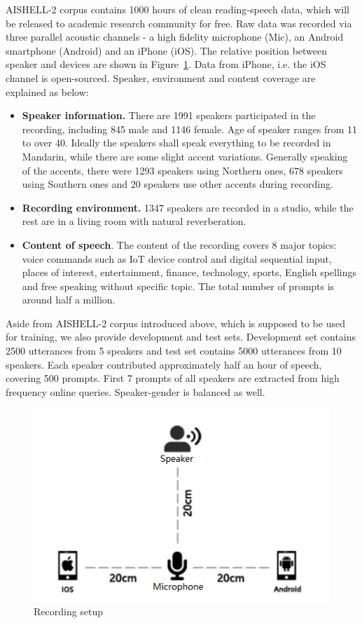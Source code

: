 \documentclass[a4paper]{article}
\begin{document}
AISHELL-2 corpus contains 1000 hours of clean reading-speech data, which will be released to academic research community for free. Raw data was recorded via three parallel acoustic channels - a high fidelity microphone (Mic), an Android smartphone (Android) and an iPhone (iOS). The relative position between speaker and devices are shown in Figure~\ref{fig:setup}. Data from iPhone, i.e. the iOS channel is open-sourced. Speaker, environment and content coverage are explained as below:
\begin{itemize}
\item \textbf{Speaker information.} There are 1991 speakers participated in the recording, including 845 male and 1146 female. Age of speaker ranges from 11 to over 40. Ideally the speakers shall speak everything to be recorded in Mandarin, while there are some slight accent variations. Generally speaking of the accents, there were 1293 speakers using Northern ones, 678 speakers using Southern ones and 20 speakers use other accents during recording.
\item \textbf{Recording environment.} 1347 speakers are recorded in a studio, while the rest are in a living room with natural reverberation.
\item \textbf{Content of speech}. The content of the recording covers 8 major topics: voice commands such as IoT device control and digital sequential input, places of interest, entertainment, finance, technology, sports, English spellings and free speaking without specific topic. The total number of prompts is around half a million.
\end{itemize}

\noindent Aside from AISHELL-2 corpus introduced above, which is supposed to be used for training,
we also provide development and test sets.
Development set contains 2500 utterances from 5 speakers and test set contains 5000 utterances from 10 speakers.
Each speaker contributed approximately half an hour of speech, covering 500 prompts.
First 7 prompts of all speakers are extracted from high frequency online queries. Speaker-gender is balanced as well.

\begin{figure}[h]
  \centering
  \includegraphics[width=\linewidth]{setup.jpg}
  \caption{Recording setup}
  \label{fig:setup}
\end{figure}
\end{document}
